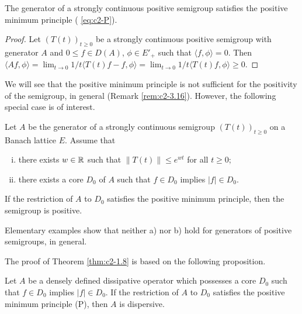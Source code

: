 \begin{proposition}\label{prop:c2-1.7}
The generator of a strongly continuous positive semigroup satisfies the positive minimum principle ( \eqref{eq:c2-P}).  
\end{proposition}

\begin{proof}
Let $(T(t))_{t \geq 0}$ be a strongly continuous positive semigroup with generator $A$ and $0 \leq f \in D(A)$, $\phi \in E'_{+}$ such that $\langle f,\phi \rangle = 0$.
Then $\langle Af,\phi \rangle = \lim_{t \to 0} 1/t \langle T(t)f - f, \phi \rangle = \lim_{t \to 0} 1/t \langle T(t)f, \phi \rangle \geq 0$.
\end{proof}

We will see that the positive minimum principle is not sufficient for the positivity of the semigroup, in general (Remark \ref{rem:c2-3.16}).
However, the following special case is of interest.
\begin{theorem}\label{thm:c2-1.8}
Let $A$ be the generator of a strongly continuous semigroup $(T(t))_{t \geq 0}$ on a Banach lattice $E$.
Assume that
\begin{enumerate}[(i)]
\item \label{thm:c2-1.8-1}
there exists $w \in \mathbb{R}$ such that $\|T(t)\| \leq e^{wt}$ for all $t \geq 0$;
\item \label{thm:c2-1.8-2}
there exists a core $D_{0}$ of $A$ such that $f \in D_{0}$ implies $|f| \in D_{0}$.
\end{enumerate}
If the restriction of $A$ to $D_{0}$ satisfies the positive minimum principle, then the semigroup is positive.
\end{theorem}

\begin{remark*}\label{rem:c2-1.8-Claude}
Elementary examples show that neither a) nor b) hold for generators of positive semigroups, in general.
\end{remark*}

The proof of Theorem \ref{thm:c2-1.8}   is based on the following proposition.

\begin{proposition}\label{prop:c2-1.9}
Let $A$ be a densely defined dissipative operator which possesses a core $D_{0}$ such that $f \in D_{0}$ implies $|f| \in D_{0}$.
If the restriction of $A$ to $D_{0}$ satisfies the positive minimum principle (P), then $A$ is dispersive.
\end{proposition}

